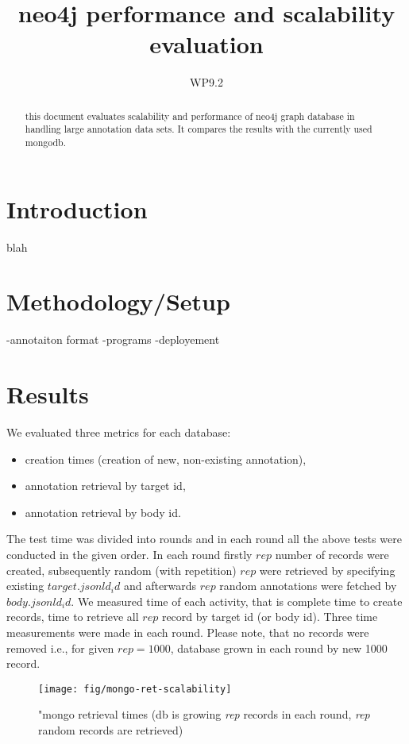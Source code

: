 \documentclass[a4paper,10pt]{article}
\title{neo4j performance and scalability evaluation}
\author{WP9.2}
\begin{document}
\maketitle

\begin{abstract}
this document evaluates scalability and performance of neo4j graph database in handling 
large annotation data sets. It compares the results with the currently used mongodb. 
\end{abstract}

\section{Introduction}
blah

\section{Methodology/Setup}
-annotaiton format
-programs
-deployement

\section{Results}
We evaluated three metrics for each database:
\begin{itemize}
 \item creation times (creation of new, non-existing annotation),
 \item annotation retrieval by target id,
 \item annotation retrieval by body id.
\end{itemize}

The test time was divided into rounds and in each round all the above tests were 
conducted in the given order. In each round firstly $rep$ number of records were 
created, subsequently random (with repetition) $rep$ were retrieved by 
specifying existing $target.jsonld_id$ and afterwards $rep$ random annotations 
were fetched by $body.jsonld_id$. We measured time of each activity, that is 
complete time to create records, time to retrieve all $rep$ record by target id 
(or body id). Three time measurements were made in each round. Please note, that 
no records were removed i.e., for given $rep=1000$, database grown in each round 
by new 1000 record. 


\begin{figure}
\centering
 \texttt{[image: fig/mongo-ret-scalability]} 
 \caption{"mongo retrieval times (db is growing \emph{rep} records in each round, \emph{rep} random records are retrieved)} \label{fig:mongo-ret}
\end{figure}
\end{document}
